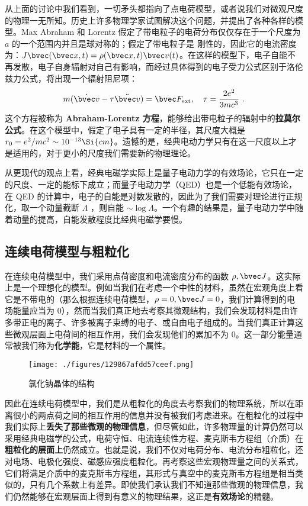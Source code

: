 从上面的讨论中我们看到，一切矛头都指向了点电荷模型，或者说我们对微观尺度的物理一无所知。历史上许多物理学家试图解决这个问题，并提出了各种各样的模型。Max Abraham 和 Lorentz 假定了带电粒子的电荷分布仅仅存在于一个尺度为 $a$ 的一个范围内并且是球对称的；假定了带电粒子是
刚性的，因此它的电流密度为：$J\bvec (\bvec x, t) =\rho(\bvec x, t)\bvec v(t)$。在这样的模型下，电子自能不再发散，电子自身辐射对自己有影响，而经过具体得到的电子受力公式区别于洛伦兹力公式，将出现一个辐射阻尼项：
\begin{equation}
m(\dot{\bvec v}-\tau \ddot{\bvec v})=\bvec F_{\text{ext}},\quad \tau =\frac{2e^2}{3mc^3}~.
\end{equation}
这个方程被称为 \textbf{Abraham-Lorentz 方程}，能够给出带电粒子的辐射中的\textbf{拉莫尔公式}。在这个模型中，假定了电子具有一定的半径，其尺度大概是 $r_0=e^2/mc^2\sim 10^{-13} \Si{cm}$。遗憾的是，经典电动力学只有在这一尺度以上才是适用的，对于更小的尺度我们需要新的物理理论。

从更现代的观点上看，经典电磁学实际上是量子电动力学的有效场论，它只在一定的尺度、一定的能标下成立；而量子电动力学（QED）也是一个低能有效场论，在 QED 的计算中，电子的自能是对数发散的，因此为了我们需要对理论进行正规化，取一个动量截断 $\Lambda$ ，则自能 $\sim \log \Lambda$。一个有趣的结果是，量子电动力学中随着动量的提高，自能发散程度比经典电磁学要慢。

\subsection{连续电荷模型与粗粒化}
在连续电荷模型中，我们采用点荷密度和电流密度分布的函数 $\rho,\bvec J$。这实际上是一个理想化的模型。例如当我们在考虑一个中性的材料，虽然在宏观角度上看它是不带电的（那么根据连续电荷模型，$\rho=0,\bvec J=0$，我们计算得到的电场能量应当为 $0$），然而当我们真正地去考察其微观结构，我们会发现材料是由许多带正电的离子、许多被离子束缚的电子、或自由电子组成的。当我们真正计算这些微观层面上电荷间的相互作用，我们会发现他们的累加不为 $0$。这一部分能量通常被我们称为\textbf{化学能}，它是材料的一个属性。
\begin{figure}[ht]
\centering
\texttt{[image: ./figures/129867afdd57ceef.png]}
\caption{氯化钠晶体的结构} \label{fig_elecdb_2}
\end{figure}


因此在连续电荷模型中，我们是从粗粒化的角度去考察我们的物理系统，所以在距离很小的两点荷之间的相互作用的信息并没有被我们考虑进来。在粗粒化的过程中我们实际上\textbf{丢失了那些微观的物理信息}，但尽管如此，许多物理量的计算仍然可以采用经典电磁学的公式，电荷守恒、电流连续性方程、麦克斯韦方程组（介质）在\textbf{粗粒化的层面上}仍然成立。也就是说，我们不仅对电荷分布、电流分布粗粒化，还对电场、电极化强度、磁感应强度粗粒化。再考察这些宏观物理量之间的关系式，它们将满足介质中的麦克斯韦方程组，其形式与真空中的麦克斯韦方程组是相当类似的，只有几个系数上有差异。即使我们承认我们不知道那些微观的物理信息，我们仍然能够在宏观层面上得到有意义的物理结果，这正是\textbf{有效场论}的精髓。